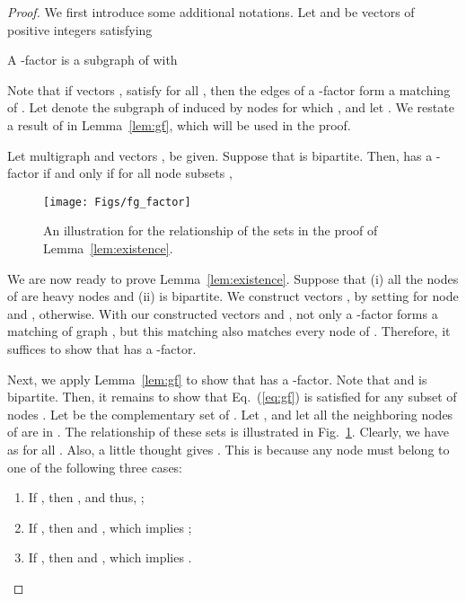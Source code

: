 \documentclass[10pt,journal,compsoc]{IEEEtran}
\begin{document}
\begin{proof}
We first introduce some additional notations.
Let  and  be vectors of positive integers satisfying

A -factor is a subgraph  of  with

Note that if vectors ,  satisfy  for all ,
then the edges of a -factor form a matching of . 
Let  denote the subgraph of  induced by nodes  for which ,
and let . We restate a result of \cite{anstee90} in Lemma~\ref{lem:gf}, 
which will be used in the proof.

\begin{lemma}
\label{lem:gf}
Let multigraph  and vectors ,  be given. Suppose that  is bipartite. 
Then,  has a -factor if and only if for all node subsets ,

\end{lemma}

\begin{figure}[t!]
  \centering
    \texttt{[image: Figs/fg\_factor]}
  \caption{An illustration for the relationship of the sets in the proof of Lemma~\ref{lem:existence}.}
  \label{fig:set}
\end{figure}



We are now ready to prove Lemma~\ref{lem:existence}. 
Suppose that (i) all the nodes of  are heavy nodes and (ii)  is bipartite. 
We construct vectors ,  by setting  for node  and ,  otherwise. 
With our constructed vectors  and , not only a -factor forms a matching of graph , 
but this matching also matches every node of .
Therefore, it suffices to show that  has a -factor.

Next, we apply Lemma~\ref{lem:gf} to show that  has a -factor.
Note that  and  is bipartite.
Then, it remains to show that Eq.~(\ref{eq:gf}) is satisfied for any subset of nodes . 
Let  be the complementary set of . Let 
, and let  all 
the neighboring nodes of  are in . The relationship of these sets is illustrated in 
Fig.~\ref{fig:set}. Clearly, we have  as  for 
all . Also, a little thought gives 
. This is because 
any node  must belong to one of the following three cases:
\begin{enumerate}
\item If , then , and thus, ; 

\item If , then  and , 
which implies ;

\item If , then  and , which implies .
\end{enumerate}


\end{proof}
\end{document}
